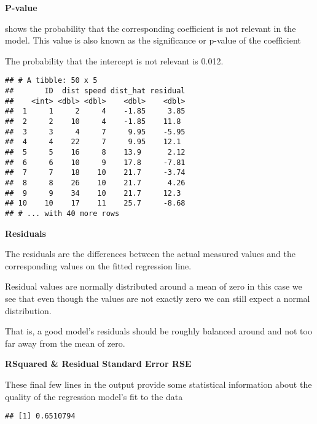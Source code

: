 \documentclass[
]{article}
\newenvironment{Shaded}{\begin{snugshade}}{\end{snugshade}}
\newcommand{\FunctionTok}[1]{\textcolor[rgb]{0.00,0.00,0.00}{#1}}
\newcommand{\NormalTok}[1]{#1}
\newcommand{\SpecialCharTok}[1]{\textcolor[rgb]{0.00,0.00,0.00}{#1}}
\begin{document}
\textbf{P-value}

shows the probability that the corresponding coefficient is not relevant
in the model. This value is also known as the significance or p-value of
the coefficient

The probability that the intercept is not relevant is 0.012.

\begin{verbatim}
## # A tibble: 50 x 5
##       ID  dist speed dist_hat residual
##    <int> <dbl> <dbl>    <dbl>    <dbl>
##  1     1     2     4    -1.85     3.85
##  2     2    10     4    -1.85    11.8 
##  3     3     4     7     9.95    -5.95
##  4     4    22     7     9.95    12.1 
##  5     5    16     8    13.9      2.12
##  6     6    10     9    17.8     -7.81
##  7     7    18    10    21.7     -3.74
##  8     8    26    10    21.7      4.26
##  9     9    34    10    21.7     12.3 
## 10    10    17    11    25.7     -8.68
## # ... with 40 more rows
\end{verbatim}

\textbf{Residuals}

The residuals are the differences between the actual measured values and
the corresponding values on the fitted regression line.

Residual values are normally distributed around a mean of zero in this
case we see that even though the values are not exactly zero we can
still expect a normal distribution.

That is, a good model's residuals should be roughly balanced around and
not too far away from the mean of zero.

\textbf{RSquared \& Residual Standard Error RSE}

These final few lines in the output provide some statistical information
about the quality of the regression model's fit to the data

\begin{Shaded}
\end{Shaded}

\begin{verbatim}
## [1] 0.6510794
\end{verbatim}

\begin{Shaded}
\end{Shaded}
\end{document}
